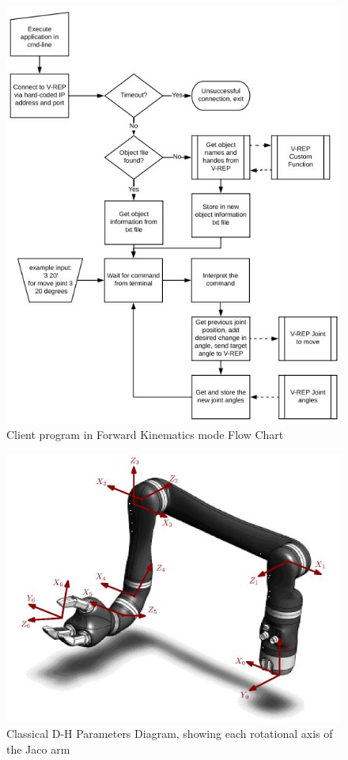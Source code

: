 \documentclass[12pt,openany,a4paper]{book}
\begin{document}
\begin{center}
\begin{figure}[htb]
  \includegraphics[width=\linewidth]{client_fk.jpg}
\caption{Client program in Forward Kinematics mode Flow Chart}
\end{figure}
\end{center}

\vspace{\baselineskip}

\begin{center}
\begin{figure}[htb]
  \includegraphics[width=0.7\linewidth]{jaco_axis.jpg}
\caption{Classical D-H Parameters Diagram, showing each rotational axis of the Jaco arm \cite{specificationGuide}}
\end{figure}
\end{center}
\end{document}
